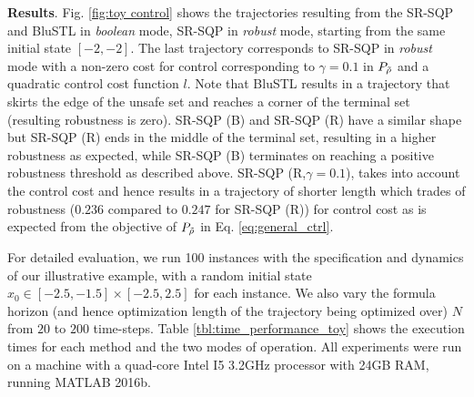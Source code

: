 \textbf{Results}.
Fig. \ref{fig:toy control} shows the trajectories resulting from the SR-SQP and BluSTL in \textit{boolean} mode, SR-SQP in \textit{robust} mode, starting from the same initial state $[-2,-2]$. The last trajectory corresponds to SR-SQP in \textit{robust} mode with a non-zero cost for control corresponding to $\gamma=0.1$  in $P_{\tilde{\rho}}$ and a quadratic control cost function $l$. Note that BluSTL results in a trajectory that skirts the edge of the unsafe set and reaches a corner of the terminal set (resulting robustness is zero). SR-SQP (B) and SR-SQP (R) have a similar shape but SR-SQP (R) ends in the middle of the terminal set, resulting in a higher robustness as expected, while SR-SQP (B) terminates on reaching a positive robustness threshold as described above. SR-SQP (R,$\gamma=0.1$), takes into account the control cost and hence results in a trajectory of shorter length which trades of robustness ($0.236$ compared to $0.247$ for SR-SQP (R)) for control cost as is expected from the objective of $P_{\tilde{\rho}}$ in Eq. \ref{eq:general_ctrl}.


For detailed evaluation, we run 100 instances with the specification and dynamics of our illustrative example, with a random initial state $x_0 \in [-2.5,-1.5] \times [-2.5,2.5]$ for each instance. We also vary the formula horizon (and hence optimization length of the trajectory being optimized over) $N$ from $20$ to $200$ time-steps. Table \ref{tbl:time_performance_toy} shows the execution times for each method and the two modes of operation. All experiments were run on a machine with a quad-core Intel I5 3.2GHz processor with 24GB RAM, running MATLAB 2016b.


